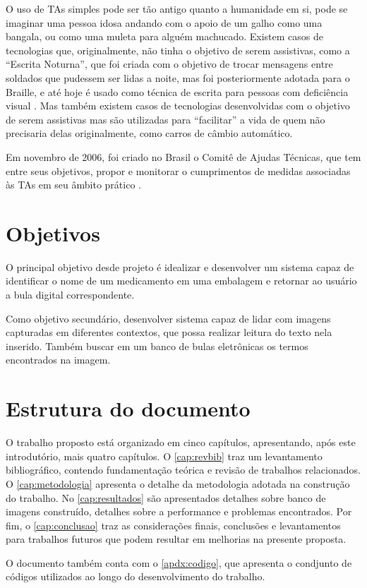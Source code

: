 O uso de \acp{TA} simples pode ser tão antigo quanto a humanidade em si, pode se imaginar uma pessoa idosa andando com o apoio de um galho como uma bangala, ou como uma muleta para alguém machucado.
Existem casos de tecnologias que, originalmente, não tinha o objetivo de serem assistivas, como a ``Escrita Noturna'', que foi criada com o objetivo de trocar mensagens entre soldados que pudessem ser lidas a noite, mas foi posteriormente adotada para o Braille, e até hoje é usado como técnica de escrita para pessoas com deficiência visual \cite{sebold2020tecnologia}.
Mas também existem casos de tecnologias desenvolvidas com o objetivo de serem assistivas mas são utilizadas para ``facilitar'' a vida de quem não precisaria delas originalmente, como carros de câmbio automático.

Em novembro de 2006, foi criado no Brasil o Comitê de Ajudas Técnicas, que tem entre seus objetivos, propor e monitorar o cumprimentos de medidas associadas às \acp{TA} em seu âmbito prático
\cite{galvao2009tecnologia}.



\section{Objetivos}

O principal objetivo desde projeto é idealizar e desenvolver um sistema capaz de identificar o nome de um medicamento em uma embalagem e retornar ao usuário a bula digital correspondente.

Como objetivo secundário, desenvolver sistema capaz de lidar com imagens capturadas em diferentes contextos, que possa realizar leitura do texto nela inserido. Também buscar em um banco de bulas eletrônicas os termos encontrados na imagem.


\section{Estrutura do documento}


O trabalho proposto está organizado em cinco capítulos, apresentando, após este introdutório, mais quatro capítulos. O \autoref{cap:revbib} traz um levantamento bibliográfico, contendo fundamentação teórica e revisão de trabalhos relacionados. O \autoref{cap:metodologia} apresenta o detalhe da metodologia adotada na construção do trabalho. No \autoref{cap:resultados} são apresentados detalhes sobre banco de imagens construído, detalhes sobre a performance e problemas encontrados. Por fim, o \autoref{cap:conclusao} traz as considerações finais, conclusões e levantamentos para trabalhos futuros que podem resultar em melhorias na presente proposta.

O documento também conta com o \autoref{apdx:codigo}, que apresenta o condjunto de códigos utilizados ao longo do desenvolvimento do trabalho.
